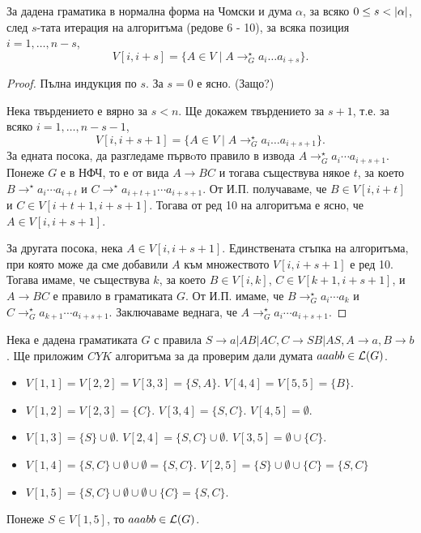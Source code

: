 \begin{lemma}
  За дадена граматика в нормална форма на Чомски и дума $\alpha$, 
  за всяко $0 \leq s < \lvert{\alpha}\rvert$, след $s$-тата итерация на алгоритъма (редове 6 - 10), за всяка позиция $i = 1,\dots,n-s$,
  \[V[i,i+s] = \{A \in V \mid A \rightarrow^\star_G a_i\dots a_{i+s}\}.\]
\end{lemma}
\begin{proof}
  Пълна индукция по $s$.
  За $s = 0$  е ясно. (Защо?)

  Нека твърдението е вярно за $s < n$. Ще докажем твърдението за $s+1$, т.е. за всяко $i = 1,\dots,n-s-1$,
  \[V[i,i+s+1] = \{A \in V \mid A \rightarrow^\star_G a_i\dots a_{i+s+1}\}.\]
  За едната посока, да разгледаме първoто правило в извода $A \to^\star_G a_i\cdots a_{i+s+1}$.
  Понеже $G$ е в НФЧ, то е от вида $A \to BC$ и тогава съществува някое $t$, за което 
  $B \to^\star a_i\cdots a_{i+t}$ и $C \to^\star a_{i+t+1}\cdots a_{i+s+1}$.
  От И.П. получаваме, че $B \in V[i,i+t]$ и $C \in V[i+t+1,i+s+1]$.
  Тогава от ред 10 на алгоритъма е ясно, че $A \in V[i,i+s+1]$.
  
  За другата посока, нека $A \in V[i,i+s+1]$.
  Единствената стъпка на алгоритъма, при която може да сме добавили $A$ към множеството $V[i,i+s+1]$ е ред 10.
  Тогава имаме, че съществува $k$, за което $B \in V[i,k]$, $C \in V[k+1,i+s+1]$, и $A\to BC$ е правило в граматиката $G$.
  От И.П. имаме, че $B \to^\star_G a_i\cdots a_k$ и $C \to^\star_G a_{k+1}\cdots a_{i+s+1}$.
  Заключаваме веднага, че $A \to^\star_G a_i\cdots a_{i+s+1}$.
\end{proof}

\begin{example}
  Нека е дадена граматиката $G$ с правила 
  $S\rightarrow a|AB|AC, C\rightarrow SB|AS,A\rightarrow a, B\rightarrow b$.
  Ще приложим $CYK$ алгоритъма за да проверим дали думата $aaabb \in \mathcal{L}(G)$.
  \begin{itemize}
  \item 
    $V[1,1] = V[2,2] = V[3,3] = \{S,A\}$.
    $V[4,4] = V[5,5] = \{B\}$.
  \item
    $V[1,2] = V[2,3] = \{C\}$.
    $V[3,4] = \{S,C\}$.
    $V[4,5] = \emptyset$.
  \item
    $V[1,3] = \{S\} \cup \emptyset$.
    $V[2,4] = \{S,C\} \cup \emptyset$.
    $V[3,5] = \emptyset \cup \{C\}$.
  \item
    $V[1,4] = \{S,C\} \cup \emptyset \cup \emptyset = \{S,C\}$.
    $V[2,5] = \{S\} \cup \emptyset \cup \{C\} = \{S,C\}$
  \item
    $V[1,5] = \{S,C\} \cup \emptyset \cup \emptyset \cup \{C\}= \{S,C\}$.
  \end{itemize}
  Понеже $S \in V[1,5]$, то $aaabb \in \mathcal{L}(G)$.
\end{example}

